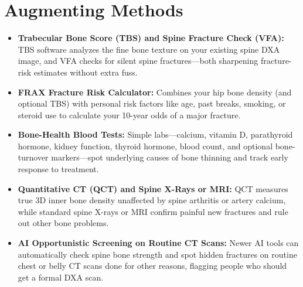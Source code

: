 \section{Augmenting Methods}
\begin{itemize}
\item \textbf{Trabecular Bone Score (TBS) and Spine Fracture Check (VFA):} TBS software analyzes the fine bone texture on your existing spine DXA image, and VFA checks for silent spine fractures---both sharpening fracture-risk estimates without extra fuss.
\item \textbf{FRAX Fracture Risk Calculator:} Combines your hip bone density (and optional TBS) with personal risk factors like age, past breaks, smoking, or steroid use to calculate your 10-year odds of a major fracture.
\item \textbf{Bone-Health Blood Tests:} Simple labs---calcium, vitamin D, parathyroid hormone, kidney function, thyroid hormone, blood count, and optional bone-turnover markers---spot underlying causes of bone thinning and track early response to treatment.
\item \textbf{Quantitative CT (QCT) and Spine X-Rays or MRI:} QCT measures true 3D inner bone density unaffected by spine arthritis or artery calcium, while standard spine X-rays or MRI confirm painful new fractures and rule out other bone problems.
\item \textbf{AI Opportunistic Screening on Routine CT Scans:} Newer AI tools can automatically check spine bone strength and spot hidden fractures on routine chest or belly CT scans done for other reasons, flagging people who should get a formal DXA scan.
\end{itemize}


